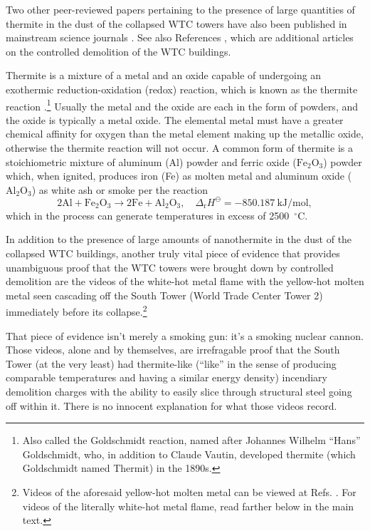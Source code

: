\documentclass[letterpaper,12pt]{article}
\begin{document}
Two other peer-reviewed papers pertaining to the presence of large quantities of thermite in the dust of the collapsed WTC towers have also been published in mainstream science journals \cite{JonesEtAl2008-4,RyanEtAl2009}. See also References , which are additional articles on the controlled demolition of the WTC buildings.

Thermite is a mixture of a metal and an oxide capable of undergoing an exothermic reduction-oxidation (redox) reaction, which is known as the thermite reaction \cite{WangEtAl1993}.\footnote{Also called the Goldschmidt reaction, named after Johannes Wilhelm ``Hans'' Goldschmidt, who, in addition to Claude Vautin, developed thermite (which Goldschmidt named Thermit) in the 1890s.} Usually the metal and the oxide are each in the form of powders, and the oxide is typically a metal oxide. The elemental metal must have a greater chemical affinity for oxygen than the metal element making up the metallic oxide, otherwise the thermite reaction will not occur. A common form of thermite is a stoichiometric mixture of aluminum (Al) powder and ferric oxide (\( \text{Fe}_2\text{O}_3 \)) powder which, when ignited, produces iron (Fe) as molten metal and aluminum oxide (\( \text{Al}_2\text{O}_3 \)) as white ash or smoke per the reaction \begin{equation}
2 \text{Al} + \text{Fe}_2\text{O}_3 \rightarrow 2 \text{Fe} + \text{Al}_2\text{O}_3,\quad \Delta_\text{r} H^\ominus = -850.187\: \text{k} \text{J} / \text{mol},
\end{equation} which in the process can generate temperatures in excess of 2500~\( ^{\circ}\text{C} \).

In addition to the presence of large amounts of nanothermite in the dust of the collapsed WTC buildings, another truly vital piece of evidence that provides unambiguous proof that the WTC towers were brought down by controlled demolition are the videos of the white-hot metal flame with the yellow-hot molten metal seen cascading off the South Tower (World Trade Center Tower 2) immediately before its collapse.\footnote{Videos of the aforesaid yellow-hot molten metal can be viewed at Refs. . For videos of the literally white-hot metal flame, read farther below in the main text.}

That piece of evidence isn't merely a smoking gun: it's a smoking nuclear cannon. Those videos, alone and by themselves, are irrefragable proof that the South Tower (at the very least) had thermite-like (``like'' in the sense of producing comparable temperatures and having a similar energy density) incendiary demolition charges with the ability to easily slice through structural steel going off within it. There is no innocent explanation for what those videos record.
\end{document}
